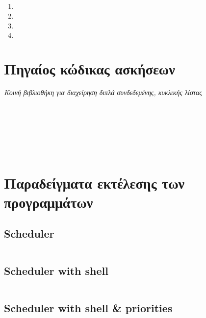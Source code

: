 \documentclass[a4paper,10pt]{article} \usepackage{anysize}
\begin{document}
\subsection{}
\begin{enumerate}
    \item 
    \item 
    \item 
    \item 
\end{enumerate}


\vspace{1cm}
\def\thesubsection {Άσκηση \arabic{section}.\arabic{subsection}}
\section*{Πηγαίος κώδικας ασκήσεων}
\emph{Κοινή βιβλιοθήκη για διαχείρηση διπλά συνδεδεμένης, κυκλικής λίστας}
\inputminted[linenos,fontsize=\footnotesize,frame=leftline]{c}{files/queue.h}
\inputminted[linenos,fontsize=\footnotesize,frame=leftline]{c}{files/queue.c}
\setcounter{section}{1}
\setcounter{subsection}{0}
\subsection{}
\inputminted[linenos,fontsize=\footnotesize,frame=leftline]{c}{files/scheduler_1.1.c}
\subsection{}
\inputminted[linenos,fontsize=\footnotesize,frame=leftline]{c}{files/scheduler-shell_1.2.c}
\subsection{}
\inputminted[linenos,fontsize=\footnotesize,frame=leftline]{c}{files/scheduler-shell_1.3.c}

\section*{Παραδείγματα εκτέλεσης των προγραμμάτων}
\def\thesubsection {Πρόγραμμα \arabic{section}.\arabic{subsection}:}
\setcounter{subsection}{0}
\subsection{Scheduler}
\inputminted[linenos,fontsize=\footnotesize,frame=leftline]{bash}{files/scheduler_1.1.out}
\subsection{Scheduler with shell}
\inputminted[linenos,fontsize=\footnotesize,frame=leftline]{bash}{files/scheduler-shell_1.2.out}
\subsection{Scheduler with shell \& priorities}
\inputminted[linenos,fontsize=\footnotesize,frame=leftline]{bash}{files/scheduler-shell_1.3.out}
\end{document}
